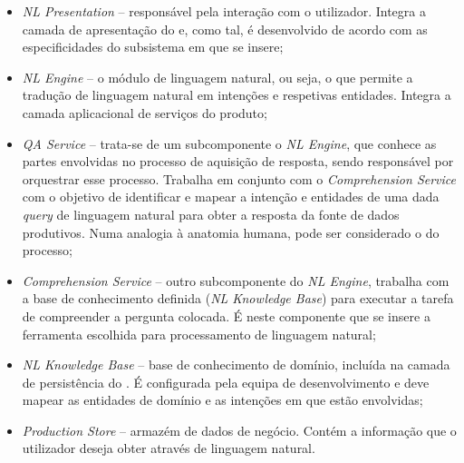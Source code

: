 \begin{itemize}
    \item 
    {
        \textit{NL Presentation} -- responsável pela interação com o utilizador. Integra a camada de apresentação do {\productname} e, como tal, é desenvolvido de acordo com as especificidades do subsistema em que se insere;
    }
    \item 
    {
        \textit{NL Engine} -- o módulo de linguagem natural, ou seja, o  que permite a tradução de linguagem natural em intenções e respetivas entidades. Integra a camada aplicacional de serviços do produto;
    }
    \item 
    {
        \textit{QA Service} -- trata-se de um subcomponente o \textit{NL Engine}, que conhece as partes envolvidas no processo de aquisição de resposta, sendo responsável por orquestrar esse processo. Trabalha em conjunto com o \textit{Comprehension Service} com o objetivo de identificar e mapear a intenção e entidades de uma dada \textit{query} de linguagem natural para obter a resposta da fonte de dados produtivos. Numa analogia à anatomia humana, pode ser considerado o  do processo;
    }
    \item 
    {
        \textit{Comprehension Service} -- outro subcomponente do \textit{NL Engine}, trabalha com a base de conhecimento definida (\textit{NL Knowledge Base}) para executar a tarefa de compreender a pergunta colocada. É neste componente que se insere a ferramenta escolhida para processamento de linguagem natural;
    }
    \item 
    {
        \textit{NL Knowledge Base} -- base de conhecimento de domínio, incluída na camada de persistência do {\productname}. É configurada pela equipa de desenvolvimento e deve mapear as entidades de domínio e as intenções em que estão envolvidas;
    }
    \item 
    {
        \textit{Production Store} -- armazém de dados de negócio. Contém a informação que o utilizador deseja obter através de linguagem natural.
    }
\end{itemize}

